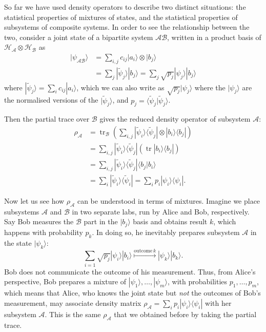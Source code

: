\documentclass[fleqn,a4paper]{article}
\theoremstyle{definition}
\theoremstyle{definition}
\theoremstyle{definition}
\theoremstyle{definition}
\theoremstyle{remark}
\begin{document}
So far we have used density operators to describe two distinct situations: the statistical properties of mixtures of states, and the statistical properties of subsystems of composite systems.
In order to see the relationship between the two, consider a joint state of a bipartite system \(\mathcal{AB}\), written in a product basis of \(\mathcal{H}_{\mathcal{A}}\otimes\mathcal{H}_{\mathcal{B}}\) as
\[
  \begin{aligned}
    |\psi_{\mathcal{AB}}\rangle
    &= \sum_{i,j} c_{ij}|a_i\rangle\otimes|b_j\rangle
  \\&= \sum_{j} |\widetilde\psi_j\rangle|b_j\rangle
    = \sum_{j} \sqrt{p_j}|\psi_j\rangle|b_j\rangle
  \end{aligned}
\]
where \(|\widetilde\psi_j\rangle = \sum_i c_{ij}|a_i\rangle\), which we can also write as \(\sqrt{p_j}|\psi_j\rangle\) where the \(|\psi_j\rangle\) are the normalised versions of the \(|\widetilde\psi_j\rangle\), and \(p_j=\langle\widetilde\psi_j|\widetilde\psi_j\rangle\).

Then the partial trace over \(\mathcal{B}\) gives the reduced density operator of subsystem \(\mathcal{A}\):
\[
  \begin{aligned}
    \rho_{\mathcal{A}}
    &=\operatorname{tr}_{\mathcal{B}} \left( \sum_{i,j} |\widetilde\psi_i\rangle\langle\widetilde\psi_j| \otimes |b_i\rangle\langle b_j| \right)
  \\&= \sum_{i,j} |\widetilde\psi_i\rangle\langle\widetilde\psi_j| (\operatorname{tr}|b_i\rangle\langle b_j|)
  \\&= \sum_{i,j} |\widetilde\psi_i\rangle\langle\widetilde\psi_j| \langle b_j|b_i\rangle
  \\&= \sum_{i} |\widetilde\psi_i\rangle\langle\widetilde\psi_i|
    = \sum_{i} p_i |\psi_i\rangle\langle\psi_i|.
  \end{aligned}
\]

Now let us see how \(\rho_{\mathcal{A}}\) can be understood in terms of mixtures.
Imagine we place subsystems \(\mathcal{A}\) and \(\mathcal{B}\) in two separate labs, run by Alice and Bob, respectively.
Say Bob measures the \(\mathcal{B}\) part in the \(|b_j\rangle\) basis and obtains result \(k\), which happens with probability \(p_k\).
In doing so, he inevitably prepares subsystem \(\mathcal{A}\) in the state \(|\psi_k\rangle\):
\[
  \sum_{i=1} \sqrt{p_j}|\psi_i\rangle|b_i\rangle
  \overset{\mathrm{outcome}\,k}{\longmapsto}
  |\psi_k\rangle|b_k\rangle.
\]
Bob does not communicate the outcome of his measurement.
Thus, from Alice's perspective, Bob prepares a mixture of \(|\psi_1\rangle,\ldots,|\psi_m\rangle\), with probabilities \(p_1,\ldots,p_m\), which means that Alice, who knows the joint state but \emph{not} the outcomes of Bob's measurement, may associate density matrix \(\rho_{\mathcal{A}}=\sum_i p_i|\psi_i\rangle\langle\psi_i|\) with her subsystem \(\mathcal{A}\).
This is the same \(\rho_{\mathcal{A}}\) that we obtained before by taking the partial trace.
\end{document}
